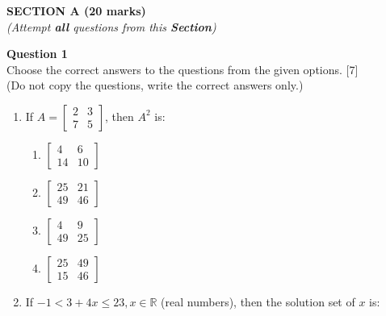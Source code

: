 \begin{center}
   \large
   \textbf{SECTION A (20 marks)}\\
   \vspace{5mm}
   \normalsize
   \textit{(Attempt \textbf{all} questions from this \textbf{Section})}
\end{center}
\par
\noindent
\textbf{Question 1}\\
Choose the correct answers to the questions from the given options. \hfill [7]\\
(Do not copy the questions, write the correct answers only.)
\par
\vspace{2mm}
\begin{enumerate}[label=(\roman*)]

    \item If $A = \begin{bmatrix}
                  2 & 3\\ 
                  7 & 5
              \end{bmatrix}$, then $A^2$ is:

        \begin{multicols}{2}
        \begin{enumerate}[label=(\alph*)]
            \item $\begin{bmatrix}  4 &  6 \\ 14 & 10 \end{bmatrix}$
            \item $\begin{bmatrix} 25 & 21 \\ 49 & 46 \end{bmatrix}$
            \item $\begin{bmatrix}  4 &  9 \\ 49 & 25 \end{bmatrix}$
            \item $\begin{bmatrix} 25 & 49 \\ 15 & 46 \end{bmatrix}$
        \end{enumerate}
        \end{multicols}

    \newpage
    \item If $-1 < 3+4x \leq 23, x \in \mathbb{R}$ (real numbers), then the solution set
          of $x$ is:


\end{enumerate}
